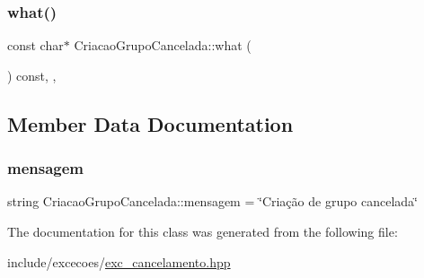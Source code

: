 \subsubsection{\texorpdfstring{what()}{what()}}
{\footnotesize\ttfamily const char$\ast$ Criacao\+Grupo\+Cancelada\+::what (\begin{DoxyParamCaption}{ }\end{DoxyParamCaption}) const\hspace{0.3cm}{\ttfamily [inline]}, {\ttfamily [override]}, {\ttfamily [noexcept]}}



\subsection{Member Data Documentation}
\mbox{\label{classCriacaoGrupoCancelada_a4077c2d32782e91f124566a7085b4acf}} 
\subsubsection{\texorpdfstring{mensagem}{mensagem}}
{\footnotesize\ttfamily string Criacao\+Grupo\+Cancelada\+::mensagem = \char`\"{}Criação de grupo cancelada\char`\"{}\hspace{0.3cm}{\ttfamily [private]}}



The documentation for this class was generated from the following file\+:\begin{DoxyCompactItemize}
\item 
include/excecoes/\hyperlink{exc__cancelamento_8hpp}{exc\+\_\+cancelamento.\+hpp}\end{DoxyCompactItemize}
